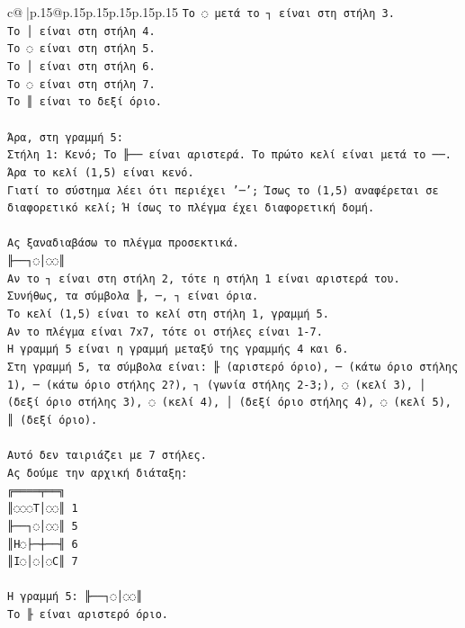\documentclass{article}
\begin{document}
{\begin{supertabular}{c@{$\;$}|p{.15\linewidth}@{}p{.15\linewidth}p{.15\linewidth}p{.15\linewidth}p{.15\linewidth}p{.15\linewidth}}
{{{\texttt{Το ◌ μετά το ┐ είναι στη στήλη 3.} \\
\texttt{Το │ είναι στη στήλη 4.} \\
\texttt{Το ◌ είναι στη στήλη 5.} \\
\texttt{Το │ είναι στη στήλη 6.} \\
\texttt{Το ◌ είναι στη στήλη 7.} \\
\texttt{Το ║ είναι το δεξί όριο.} \\
\\ 
\texttt{Άρα, στη γραμμή 5:} \\
\texttt{Στήλη 1: Κενό; Το ╟── είναι αριστερά. Το πρώτο κελί είναι μετά το ──. Άρα το κελί (1,5) είναι κενό.} \\
\texttt{Γιατί το σύστημα λέει ότι περιέχει '─'; Ίσως το (1,5) αναφέρεται σε διαφορετικό κελί; Ή ίσως το πλέγμα έχει διαφορετική δομή.} \\
\\ 
\texttt{Ας ξαναδιαβάσω το πλέγμα προσεκτικά.} \\
\texttt{╟──┐◌│◌◌║} \\
\texttt{Αν το ┐ είναι στη στήλη 2, τότε η στήλη 1 είναι αριστερά του.} \\
\texttt{Συνήθως, τα σύμβολα ╟, ─, ┐ είναι όρια.} \\
\texttt{Το κελί (1,5) είναι το κελί στη στήλη 1, γραμμή 5.} \\
\texttt{Αν το πλέγμα είναι 7x7, τότε οι στήλες είναι 1{-}7.} \\
\texttt{Η γραμμή 5 είναι η γραμμή μεταξύ της γραμμής 4 και 6.} \\
\texttt{Στη γραμμή 5, τα σύμβολα είναι: ╟ (αριστερό όριο), ─ (κάτω όριο στήλης 1), ─ (κάτω όριο στήλης 2?), ┐ (γωνία στήλης 2{-}3;), ◌ (κελί 3), │ (δεξί όριο στήλης 3), ◌ (κελί 4), │ (δεξί όριο στήλης 4), ◌ (κελί 5), ║ (δεξί όριο).} \\
\\ 
\texttt{Αυτό δεν ταιριάζει με 7 στήλες.} \\
\texttt{Ας δούμε την αρχική διάταξη:} \\
\texttt{╔════╤══╗} \\
\texttt{║◌◌◌T│◌◌║ 1} \\
\texttt{╟──┐◌│◌◌║ 5} \\
\texttt{║H◌├─┼──╢ 6} \\
\texttt{║I◌│◌│◌C║ 7} \\
\\ 
\texttt{Η γραμμή 5: ╟──┐◌│◌◌║} \\
\texttt{Το ╟ είναι αριστερό όριο.} \\
}}}
\end{supertabular}}
\end{document}
